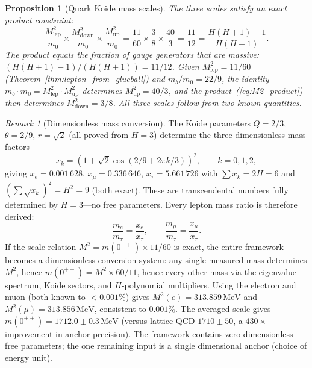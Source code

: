 \documentclass[11pt,a4paper]{article}
\newtheorem{proposition}[theorem]{Proposition}
\theoremstyle{definition}
\theoremstyle{remark}
\newtheorem{remark}[theorem]{Remark}
\begin{document}
\begin{proposition}[Quark Koide mass scales]
The three scales satisfy an exact product constraint:
\begin{equation}\label{eq:M2_product}
\frac{M^2_{\mathrm{lep}}}{m_0}\times\frac{M^2_{\mathrm{down}}}{m_0}\times\frac{M^2_{\mathrm{up}}}{m_0}=\frac{11}{60}\times\frac{3}{8}\times\frac{40}{3}=\frac{11}{12}=\frac{H(H+1)-1}{H(H+1)}.
\end{equation}
The product equals the fraction of gauge generators that are massive: $(H(H+1)-1)/(H(H+1))=11/12$. Given $M^2_{\mathrm{lep}}=11/60$ (Theorem~\ref{thm:lepton_from_glueball}) and $m_b/m_0=22/9$, the identity $m_b\cdot m_0=M^2_{\mathrm{lep}}\cdot M^2_{\mathrm{up}}$ determines $M^2_{\mathrm{up}}=40/3$, and the product~(\ref{eq:M2_product}) then determines $M^2_{\mathrm{down}}=3/8$. All three scales follow from two known quantities.
\end{proposition}

\begin{remark}[Dimensionless mass conversion]\label{rem:dimensionless_conversion}
The Koide parameters $Q=2/3$, $\theta=2/9$, $r=\sqrt{2}$ (all proved from $H=3$) determine the three dimensionless mass factors
\[
x_k = (1+\sqrt{2}\cos(2/9+2\pi k/3))^2,\qquad k=0,1,2,
\]
giving $x_e=0.001\,628$, $x_\mu=0.336\,646$, $x_\tau=5.661\,726$ with $\sum x_k=2H=6$ and $(\sum\sqrt{x_k})^2=H^2=9$ (both exact). These are transcendental numbers fully determined by $H=3$---no free parameters. Every lepton mass ratio is therefore derived:
\[
\frac{m_e}{m_\tau}=\frac{x_e}{x_\tau},\qquad \frac{m_\mu}{m_\tau}=\frac{x_\mu}{x_\tau}.
\]
If the scale relation $M^2=m(0^{++})\times 11/60$ is exact, the entire framework becomes a dimensionless conversion system: any single measured mass determines $M^2$, hence $m(0^{++})=M^2\times 60/11$, hence every other mass via the eigenvalue spectrum, Koide sectors, and $H$-polynomial multipliers. Using the electron and muon (both known to $<0.001\%$) gives $M^2(e)=313.859\,\mathrm{MeV}$ and $M^2(\mu)=313.856\,\mathrm{MeV}$, consistent to $0.001\%$. The averaged scale gives $m(0^{++})=1712.0\pm 0.3\,\mathrm{MeV}$ (versus lattice QCD $1710\pm 50$, a $430\times$ improvement in anchor precision). The framework contains zero dimensionless free parameters; the one remaining input is a single dimensional anchor (choice of energy unit).
\end{remark}
\end{document}
